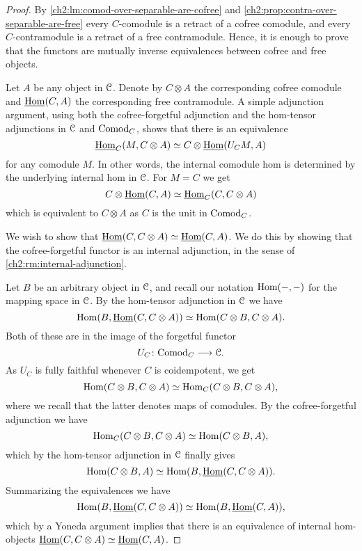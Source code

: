 \begin{proof}
    By \cref{ch2:lm:comod-over-separable-are-cofree} and \cref{ch2:prop:contra-over-separable-are-free} every $C$-comodule is a retract of a cofree comodule, and every $C$-contramodule is a retract of a free contramodule. Hence, it is enough to prove that the functors are mutually inverse equivalences between cofree and free objects.  
    
    Let $A$ be any object in $\EuScript{C}$. Denote by $C\otimes A$ the corresponding cofree comodule and $\operatorname{\underline{Hom}}(C, A)$ the corresponding free contramodule. A simple adjunction argument, using both the cofree-forgetful adjunction and the hom-tensor adjunctions in $\EuScript{C}$ and $\mathrm{Comod}_C$, shows that there is an equivalence 
    \[\operatorname{\underline{Hom}}_C(M, C\otimes A)\simeq C\otimes \operatorname{\underline{Hom}}(U_C M, A)\]
    for any comodule $M$. In other words, the internal comodule hom is determined by the underlying internal hom in $\EuScript{C}$. For $M = C$ we get
    \[C\otimes \operatorname{\underline{Hom}}(C, A)\simeq \operatorname{\underline{Hom}}_C(C, C\otimes A)\]
    which is equivalent to $C\otimes A$ as $C$ is the unit in $\mathrm{Comod}_C$. 

    We wish to show that $\operatorname{\underline{Hom}}(C, C\otimes A) \simeq \operatorname{\underline{Hom}}(C, A)$. We do this by showing that the cofree-forgetful functor is an internal adjunction, in the sense of \cref{ch2:rm:internal-adjunction}. 

    Let $B$ be an arbitrary object in $\EuScript{C}$, and recall our notation $\operatorname{Hom}(-,-)$ for the mapping space in $\EuScript{C}$. By the hom-tensor adjunction in $\EuScript{C}$ we have 
    \[\operatorname{Hom}(B, \operatorname{\underline{Hom}}(C, C\otimes A)) \simeq \operatorname{Hom}(C\otimes B, C\otimes A).\]
    Both of these are in the image of the forgetful functor 
    \[U_C\colon\mathrm{Comod}_C\longrightarrow \EuScript{C}.\]
    As $U_C$ is fully faithful whenever $C$ is coidempotent, we get 
    \[\operatorname{Hom}(C\otimes B, C\otimes A) \simeq \operatorname{Hom}_C(C\otimes B, C\otimes A),\]
    where we recall that the latter denotes maps of comodules. By the cofree-forgetful adjunction we have 
    \[\operatorname{Hom}_C(C\otimes B, C\otimes A) \simeq \operatorname{Hom}(C\otimes B, A),\]
    which by the hom-tensor adjunction in $\EuScript{C}$ finally gives 
    \[\operatorname{Hom}(C\otimes B, A) \simeq \operatorname{Hom}(B, \operatorname{\underline{Hom}}(C, C\otimes A)).\]
    Summarizing the equivalences we have 
    \[\operatorname{Hom}(B, \operatorname{\underline{Hom}}(C, C\otimes A))\simeq \operatorname{Hom}(B, \operatorname{\underline{Hom}}(C, A)),\] 
    which by a Yoneda argument implies that there is an equivalence of internal hom-objects $\operatorname{\underline{Hom}}(C, C\otimes A)\simeq \operatorname{\underline{Hom}}(C, A)$. 



\end{proof}
